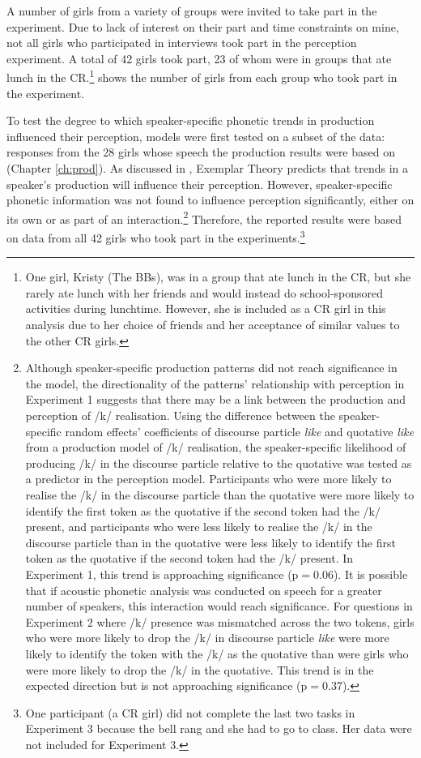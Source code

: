 A number of girls from a variety of groups were invited to take part in the experiment. Due to lack of interest on their part and time constraints on mine, not all girls who participated in interviews took part in the perception experiment. A total of 42 girls took part, 23 of whom were in groups that ate lunch in the CR.\footnote{One girl, Kristy (The BBs), was in a group that ate lunch in the CR, but she rarely ate lunch with her friends and would instead do school-sponsored activities during lunchtime. However, she is included as a CR girl in this analysis due to her choice of friends and her acceptance of similar values to the other CR girls.}  shows the number of girls from each group who took part in the experiment.



To test the degree to which speaker-specific phonetic trends in production influenced their perception, models were first tested on a subset of the data: responses from the 28 girls whose speech the production results were based on (Chapter \ref{ch:prod}). As discussed in , Exemplar Theory predicts that trends in a speaker's production will influence their perception. However, speaker-specific phonetic information was not found to influence perception significantly, either on its own or as part of an interaction.\footnote{Although speaker-specific production patterns did not reach significance in the model, the directionality of the patterns' relationship with perception in Experiment 1 suggests that there may be a link between the production and perception of /k/ realisation. Using the difference between the speaker-specific random effects' coefficients of discourse particle \textit{like} and quotative \textit{like} from a production model of /k/ realisation, the speaker-specific likelihood of producing /k/ in the discourse particle relative to the quotative was tested as a predictor in the perception model. Participants who were more likely to realise the /k/ in the discourse particle than the quotative were more likely to identify the first token as the quotative if the second token had the /k/ present, and participants who were less likely to realise the /k/ in the discourse particle than in the quotative were less likely to identify the first token as the quotative if the second token had the /k/ present. In Experiment 1, this trend is approaching significance (p$=$0.06). It is possible that if acoustic phonetic analysis was conducted on speech for a greater number of speakers, this interaction would reach significance. For questions in Experiment 2 where /k/ presence was mismatched across the two tokens, girls who were more likely to drop the /k/ in discourse particle \textit{like} were more likely to identify the token with the /k/ as the quotative than were girls who were more likely to drop the /k/ in the quotative. This trend is in the expected direction but is not approaching significance (p$=$0.37).} Therefore, the reported results were based on data from all 42 girls who took part in the experiments.\footnote{One participant (a CR girl) did not complete the last two tasks in Experiment 3 because the bell rang and she had to go to class. Her data were not included for Experiment 3.} 

